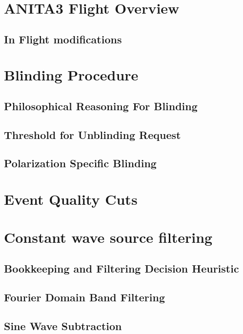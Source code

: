 \documentclass[11pt]{uhthesis}
\begin{document}
\section{ANITA3 Flight Overview}
	\subsection{In Flight modifications}

\section{Blinding Procedure}

	\subsection{Philosophical Reasoning For Blinding}
	
	\subsection{Threshold for Unblinding Request}

	\subsection{Polarization Specific Blinding}

\section{Event Quality Cuts}

\section{Constant wave source filtering}

	\subsection{Bookkeeping and Filtering Decision Heuristic}

	\subsection{Fourier Domain Band Filtering}
	
	\subsection{Sine Wave Subtraction}
\end{document}
